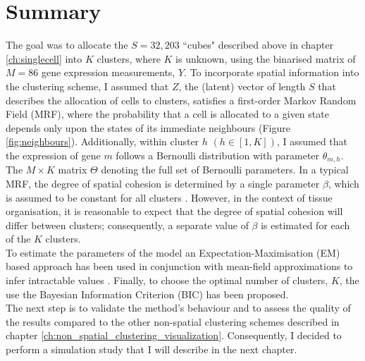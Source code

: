 \section{Summary}
The goal was to allocate the $S=32,203$ ``cubes" described above in chapter \ref{ch:singlecell} into $K$ clusters, where $K$ is unknown, using the binarised matrix of $M=86$ gene expression measurements, $Y$. To incorporate spatial information into the clustering scheme, I assumed that $Z$, the (latent) vector of length $S$ that describes the allocation of cells to clusters, satisfies a first-order Markov Random Field (MRF), where the probability that a cell is allocated to a given state depends only upon the states of its immediate neighbours (Figure \ref{fig:neighbours}). Additionally, within cluster $h$ $(h \in [1,K])$, I assumed that the expression of gene $m$ follows a Bernoulli distribution with parameter $\theta_{m,h}$. The $M \times K$ matrix  $\Theta$ denoting the full set of Bernoulli parameters. In a typical MRF, the degree of spatial cohesion is determined by a single parameter $\beta$, which is assumed to be constant for all clusters \cite{subudhi14,zhang14}. However, in the context of tissue organisation, it is reasonable to expect that the degree of spatial cohesion will differ between clusters; consequently,  a separate value of $\beta$ is estimated for each of the $K$ clusters.\\

To estimate the parameters of the model an Expectation-Maximisation (EM) based approach has been used in conjunction with mean-field approximations to infer intractable values \cite{Celeux01}. Finally, to choose the optimal number of clusters, $K$, the use the Bayesian Information Criterion (BIC) has been proposed.\\

The next step is to validate the method's behaviour and to assess the quality of the results compared to the other non-spatial clustering schemes described in chapter \ref{ch:non_spatial_clustering_visualization}. Consequently, I decided to perform a simulation study that I will describe in the next chapter.

